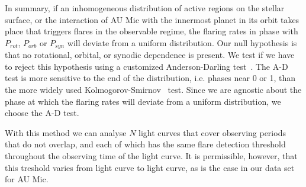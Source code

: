 \documentclass[fleqn,usenatbib,letters]{mnras}%
\begin{document}
In summary, if an inhomogeneous distribution of active regions on the stellar surface, or the interaction of AU Mic with the innermost planet in its orbit takes place that triggers flares in the observable regime, the flaring rates in phase with $P_{rot}$, $P_{orb}$ or $P_{syn}$  will deviate from a uniform distribution. Our null hypothesis is that no rotational, orbital, or synodic dependence is present. We test if we have to reject this hypothesis using a customized Anderson-Darling test~\citep[A-D test,][]{anderson1952, stephens2006}. The A-D test is more sensitive to the end of the distribution, i.e. phases near 0 or 1, than the more widely used Kolmogorov-Smirnov~\citep{kolmogorov1933sulla,smirnov1948table} test. Since we are agnostic about the phase at which the flaring rates will deviate from a uniform distribution, we choose the A-D test.

With this method we can analyse $N$ light curves that cover observing periods that do not overlap, and each of which has the same flare detection threshold throughout the observing time of the light curve. It is permissible, however, that this treshold varies from light curve to light curve, as is the case in our data set for AU Mic.
 
\end{document}
